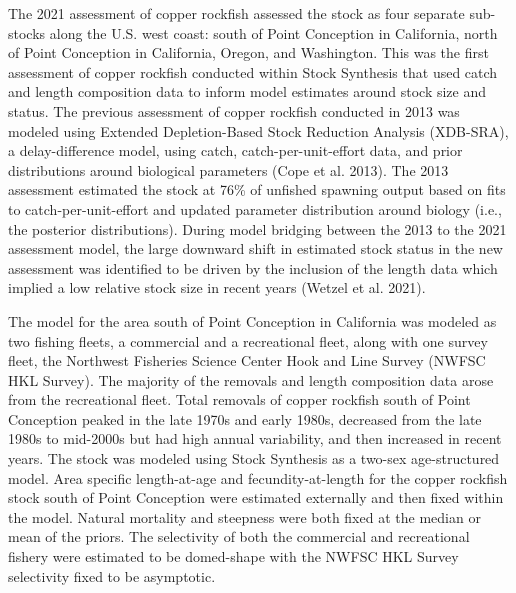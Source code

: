 \documentclass[11pt,
  english,
  a4paper,
]{article}
\begin{document}
The 2021 assessment of copper rockfish assessed the stock as four separate sub-stocks along the U.S. west coast: south of Point Conception in California, north of Point Conception in California, Oregon, and Washington. This was the first assessment of copper rockfish conducted within Stock Synthesis that used catch and length composition data to inform model estimates around stock size and status. The previous assessment of copper rockfish conducted in 2013 was modeled using Extended Depletion-Based Stock Reduction Analysis (XDB-SRA), a delay-difference model, using catch, catch-per-unit-effort data, and prior distributions around biological parameters {(Cope et al. 2013)\leavevmode\tagmcend\tagstructend}. The 2013 assessment estimated the stock at 76\% of unfished spawning output based on fits to catch-per-unit-effort and updated parameter distribution around biology (i.e., the posterior distributions). During model bridging between the 2013 to the 2021 assessment model, the large downward shift in estimated stock status in the new assessment was identified to be driven by the inclusion of the length data which implied a low relative stock size in recent years {(Wetzel et al. 2021)\leavevmode\tagmcend\tagstructend}.

\leavevmode\tagmcend\tagstructend\par


The model for the area south of Point Conception in California was modeled as two fishing fleets, a commercial and a recreational fleet, along with one survey fleet, the Northwest Fisheries Science Center Hook and Line Survey (NWFSC HKL Survey). The majority of the removals and length composition data arose from the recreational fleet. Total removals of copper rockfish south of Point Conception peaked in the late 1970s and early 1980s, decreased from the late 1980s to mid-2000s but had high annual variability, and then increased in recent years. The stock was modeled using Stock Synthesis as a two-sex age-structured model. Area specific length-at-age and fecundity-at-length for the copper rockfish stock south of Point Conception were estimated externally and then fixed within the model. Natural mortality and steepness were both fixed at the median or mean of the priors. The selectivity of both the commercial and recreational fishery were estimated to be domed-shape with the NWFSC HKL Survey selectivity fixed to be asymptotic.
\end{document}
